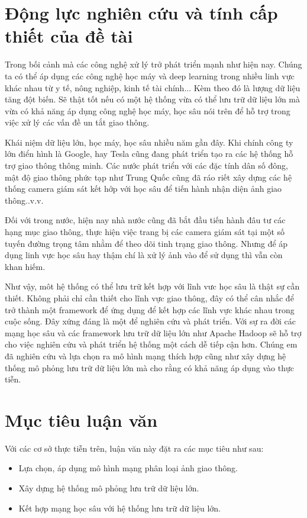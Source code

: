 \section*{Động lực nghiên cứu và tính cấp thiết của đề tài}
	Trong bối cảnh mà các công nghệ xử lý trở phát triển mạnh như hiện nay. Chúng ta có thể áp dụng các công nghệ học máy và deep learning trong nhiều linh vực khác nhau từ y tế, nông nghiệp, kinh tế tài chính... Kèm theo đó là lượng dữ liệu tăng đột biến. Sẽ thật tốt nếu có một hệ thống vừa có thể lưu trữ dữ liệu lớn mà vừa có khả năng áp dụng công nghệ học máy, học sâu nói trên để hỗ trợ trong việc xử lý các vấn đề un tắt giao thông.\par 
	Khái niệm dữ liệu lớn, học máy, học sâu nhiều năm gần đây. Khi chính công ty lớn điển hình là Google, hay Tesla cũng đang phát triển tạo ra các hệ thống hỗ trợ giao thông thông minh. Các nước phát triển với các đặc tính dân số đông, mật độ giao thông phức tạp như Trung Quốc cũng đã ráo riết xây dựng các hệ thống camera giám sát kết hớp với học sâu để tiến hành nhận diện ảnh giao thông..v.v.\par 
	Đối với trong nước, hiện nay nhà nước cũng đã bắt đầu tiến hành đâu tư các hạng mục giao thông, thực hiện việc trang bị các camera giám sát tại một số tuyến đường trọng tâm nhằm để theo dõi tinh trạng giao thông. Nhưng để áp dụng linh vực học sâu hay thậm chí là xử lý ảnh vào để sử dụng thì vẫn còn khan hiếm.\par 
	Như vậy, môt hệ thống có thể lưu trữ kết hợp với lĩnh vưc học sâu là thật sự cần thiết. Không phải chỉ cần thiết cho lĩnh vực giao thông, đây có thể cân nhắc để trở thành một framework để ứng dụng để kết hợp các lĩnh vực khác nhau trong cuộc sống. Đây xứng đáng là một để nghiên cứu và phát triển. Với sự ra đời các mạng học sâu và các framework lưu trữ dữ liệu lớn như Apache Hadoop sẽ hỗ trợ cho việc nghiên cứu và phát triển hệ thống một cách dễ tiếp cận hơn. Chúng em đã nghiên cứu và lựa chọn ra mô hình mạng thích hợp cũng như xây dựng hệ thống mô phỏng lưu trữ dữ liệu lớn mà cho rằng có khả năng áp dụng vào thực tiễn.
	
\section*{Mục tiêu luận văn}		
Với các cơ sở thực tiễn trên, luận văn này đặt ra các mục tiêu như sau:
\begin{itemize}
	\item Lựa chọn, áp dụng mô hình mạng phân loại ảnh giao thông.
	\item Xây dựng hệ thống mô phỏng lưu trữ dữ liệu lớn.
	\item Kết hợp mạng học sâu với hệ thống lưu trữ dữ liệu lớn.
\end{itemize}	 

